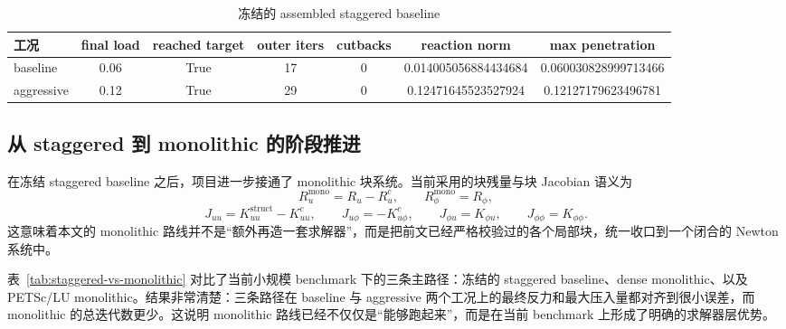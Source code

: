 \documentclass[12pt,a4paper]{ctexart}
\numberwithin{equation}{section}
\begin{document}
\begin{table}[H]
\centering
\caption{冻结的 assembled staggered baseline}
\label{tab:staggered-baseline}
\small
\begin{tabular}{lcccccc}
\toprule
工况 & final load & reached target & outer iters & cutbacks & reaction norm & max penetration \\
\midrule
baseline & 0.06 & True & 17 & 0 & 0.014005056884434684 & 0.060030828999713466 \\
aggressive & 0.12 & True & 29 & 0 & 0.12471645523527924 & 0.12127179623496781 \\
\bottomrule
\end{tabular}
\end{table}

\subsection{从 staggered 到 monolithic 的阶段推进}

在冻结 staggered baseline 之后，项目进一步接通了 monolithic 块系统。当前采用的块残量与块 Jacobian 语义为
\begin{equation*}
R_u^{\mathrm{mono}} = R_u - R_u^c,\qquad
R_\phi^{\mathrm{mono}} = R_\phi,
\end{equation*}
\begin{equation*}
J_{uu}=K_{uu}^{\mathrm{struct}}-K_{uu}^c,\qquad
J_{u\phi}=-K_{u\phi}^c,\qquad
J_{\phi u}=K_{\phi u},\qquad
J_{\phi\phi}=K_{\phi\phi}.
\end{equation*}
这意味着本文的 monolithic 路线并不是“额外再造一套求解器”，而是把前文已经严格校验过的各个局部块，统一收口到一个闭合的 Newton 系统中。

表~\ref{tab:staggered-vs-monolithic} 对比了当前小规模 benchmark 下的三条主路径：冻结的 staggered baseline、dense monolithic、以及 PETSc/LU monolithic。结果非常清楚：三条路径在 baseline 与 aggressive 两个工况上的最终反力和最大压入量都对齐到很小误差，而 monolithic 的总迭代数更少。这说明 monolithic 路线已经不仅仅是“能够跑起来”，而是在当前 benchmark 上形成了明确的求解器层优势。
\end{document}
